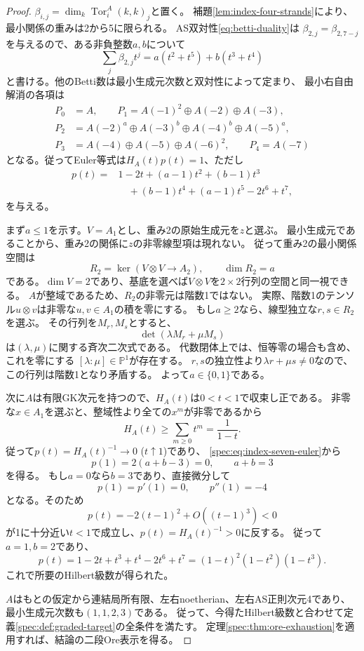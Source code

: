 \documentclass[11pt,a4paper]{ltjsarticle}
\theoremstyle{definition}
\newcommand{\Tor}{\operatorname{Tor}}
\begin{document}
\begin{proof}
$\beta_{i,j}=\dim_k\Tor_i^A(k,k)_j$と置く。
補題\ref{lem:index-four-strands}により、最小関係の重みは2から5に限られる。
AS双対性\eqref{eq:betti-duality}は
$\beta_{2,j}=\beta_{2,7-j}$を与えるので、ある非負整数$a,b$について
\[
\sum_j\beta_{2,j}t^j=a(t^2+t^5)+b(t^3+t^4)
\]
と書ける。他のBetti数は最小生成元次数と双対性によって定まり、
最小右自由解消の各項は
\[
\begin{aligned}
P_0&=A,\qquad
P_1=A(-1)^2\oplus A(-2)\oplus A(-3),\\
P_2&=A(-2)^a\oplus A(-3)^b\oplus A(-4)^b\oplus A(-5)^a,\\
P_3&=A(-4)\oplus A(-5)\oplus A(-6)^2,\qquad
P_4=A(-7)
\end{aligned}
\]
となる。従ってEuler等式は$H_A(t)p(t)=1$、ただし
\begin{equation}\label{spec:eq:index-seven-euler}
\begin{split}
p(t)={}&1-2t+(a-1)t^2+(b-1)t^3\\
&\quad +(b-1)t^4+(a-1)t^5-2t^6+t^7,
\end{split}
\end{equation}
を与える。

まず$a\le1$を示す。$V=A_1$とし、重み2の原始生成元を$z$と選ぶ。
最小生成元であることから、重み2の関係に$z$の非零線型項は現れない。
従って重み2の最小関係空間は
\[
R_2=\ker(V\otimes V\longrightarrow A_2),\qquad \dim R_2=a
\]
である。$\dim V=2$であり、基底を選べば$V\otimes V$を$2\times2$行列の空間と同一視できる。
$A$が整域であるため、$R_2$の非零元は階数1ではない。
実際、階数1のテンソル$u\otimes v$は非零な$u,v\in A_1$の積を零にする。
もし$a\ge2$なら、線型独立な$r,s\in R_2$を選ぶ。
その行列を$M_r,M_s$とすると、
\[
\det(\lambda M_r+\mu M_s)
\]
は$(\lambda,\mu)$に関する斉次二次式である。
代数閉体上では、恒等零の場合も含め、これを零にする
$[\lambda:\mu]\in\mathbb P^1$が存在する。
$r,s$の独立性より$\lambda r+\mu s\ne0$なので、この行列は階数1となり矛盾する。
よって$a\in\{0,1\}$である。

次に$A$は有限GK次元を持つので、$H_A(t)$は$0<t<1$で収束し正である。
非零な$x\in A_1$を選ぶと、整域性より全ての$x^m$が非零であるから
\[
H_A(t)\ge\sum_{m\ge0}t^m=\frac{1}{1-t}.
\]
従って$p(t)=H_A(t)^{-1}\to0$ ($t\uparrow1$)であり、
\eqref{spec:eq:index-seven-euler}から
\[
p(1)=2(a+b-3)=0,
\qquad a+b=3
\]
を得る。
もし$a=0$なら$b=3$であり、直接微分して
\[
p(1)=p'(1)=0,\qquad p''(1)=-4
\]
となる。そのため
\[
p(t)=-2(t-1)^2+O((t-1)^3)<0
\]
が1に十分近い$t<1$で成立し、$p(t)=H_A(t)^{-1}>0$に反する。
従って$a=1,b=2$であり、
\[
p(t)=1-2t+t^3+t^4-2t^6+t^7
=(1-t)^2(1-t^2)(1-t^3).
\]
これで所要のHilbert級数が得られた。

$A$はもとの仮定から連結局所有限、左右noetherian、左右AS正則次元4であり、
最小生成元次数も$(1,1,2,3)$である。
従って、今得たHilbert級数と合わせて定義\ref{spec:def:graded-target}の全条件を満たす。
定理\ref{spec:thm:ore-exhaustion}を適用すれば、結論の二段Ore表示を得る。
\end{proof}
\end{document}
